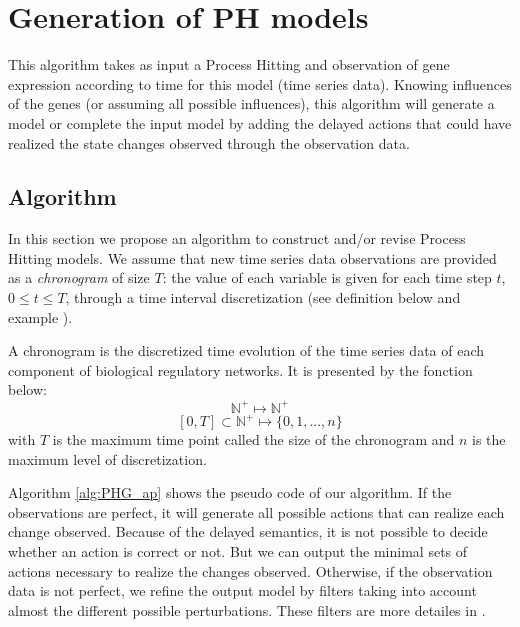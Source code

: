 
\section{Generation of PH models}
\label{sec:ph-generation}

This algorithm takes as input a Process Hitting and observation of gene expression according to time for this model (time series data).
Knowing influences of the genes (or assuming all possible influences),
this algorithm will generate a model or complete the input model by adding the delayed actions that could have realized the state changes observed through the observation data.

\subsection{Algorithm}
In this section we propose an algorithm to construct and/or revise Process Hitting models.
We assume that new time series data observations are provided as a {\it chronogram} of size $T$:
the value of each variable is given for each time step $t$, $0 \leq t \leq T$, through a time interval discretization (see definition below and example ).   

\begin{definition}[Chronogram]
A chronogram is the discretized time evolution of the time series data of each component of biological regulatory networks. It is presented by the fonction below: $$\mathds{N}^+ \longmapsto \mathds{N}^+$$
$$ [0,T] \subset \mathds{N}^+ \longmapsto \{0,1,..., n\}$$
with $T$ is the maximum time point called the size of the chronogram and $n$ is the maximum level of discretization.
\end{definition}

Algorithm \ref{alg:PHG_ap} shows the pseudo code of our algorithm.
If the observations are perfect, it will generate all possible actions that can realize each change observed.
Because of the delayed semantics, it is not possible to decide whether an action is correct or not.
But we can output the minimal sets of actions necessary to realize the changes observed.
Otherwise, if the observation data is not perfect, we refine the output model by filters taking into account almost the different possible perturbations. These filters are more detailes in .



